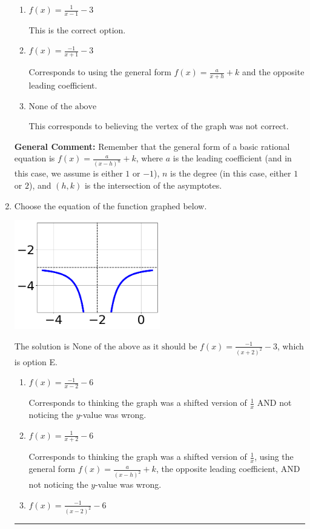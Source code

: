 \documentclass{extbook}[14pt]
\newcommand{\litem}[1]{\item #1

\rule{\textwidth}{0.4pt}}
\begin{document}
\begin{enumerate}
{\begin{enumerate}[label=\Alph*.]
Corresponds to thinking the graph was a shifted version of $\frac{1}{x^2}$, using the general form $f(x) = \frac{a}{x+h}+k$, and the opposite leading coefficient.
\item \( f(x) = \frac{1}{x - 1} - 3 \)

This is the correct option.
\item \( f(x) = \frac{-1}{x + 1} - 3 \)

Corresponds to using the general form $f(x) = \frac{a}{x+h}+k$ and the opposite leading coefficient.
\item \( \text{None of the above} \)

This corresponds to believing the vertex of the graph was not correct.
\end{enumerate}

\textbf{General Comment:} Remember that the general form of a basic rational equation is $ f(x) = \frac{a}{(x-h)^n} + k$, where $a$ is the leading coefficient (and in this case, we assume is either $1$ or $-1$), $n$ is the degree (in this case, either $1$ or $2$), and $(h, k)$ is the intersection of the asymptotes.
}
\litem{
Choose the equation of the function graphed below.

\begin{center}
    \includegraphics[width=0.5\textwidth]{../Figures/rationalGraphToEquationCopyB.png}
\end{center}


The solution is \( \text{None of the above as it should be } f(x) = \frac{-1}{(x + 2)^2} - 3 \), which is option E.\begin{enumerate}[label=\Alph*.]
\item \( f(x) = \frac{-1}{x - 2} - 6 \)

Corresponds to thinking the graph was a shifted version of $\frac{1}{x}$ AND not noticing the $y$-value was wrong.
\item \( f(x) = \frac{1}{x + 2} - 6 \)

Corresponds to thinking the graph was a shifted version of $\frac{1}{x}$, using the general form $f(x) = \frac{a}{(x-h)^2}+k$, the opposite leading coefficient, AND not noticing the $y$-value was wrong.
\item \( f(x) = \frac{-1}{(x - 2)^2} - 6 \)


\end{enumerate}}
\end{enumerate}
\end{document}
